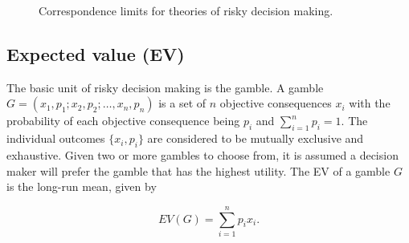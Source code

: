 \documentclass{article}\usepackage[]{graphicx}\usepackage[]{color}
\begin{document}
\begin{landscape} 
\begin{figure}[H]
\centering    
\noindent{}
\caption{Correspondence limits for theories of risky decision making.\label{fig:correspondence_limits}}
\end{figure}
\label{correspondence_limits_figure}
\end{landscape}

\subsection{Expected value (EV)}

The basic unit of risky decision making is the gamble.
A gamble $G=(x_1, p_1; x_2, p_2; \ldots, x_n, p_n)$ is a set of $n$ objective consequences $x_i$ with the
probability of each objective consequence being $p_i$ and $\sum\limits_{i=1}^{n} p_i = 1$. The individual outcomes $\{x_i, p_i\}$ are considered to be mutually exclusive and exhaustive. Given two or more gambles to choose from, it is assumed a decision maker will prefer the gamble that has the highest
utility.
The EV of a gamble $G$ is the long-run mean, given by

\begin{equation}
EV(G) = \sum_{i=1}^{n} p_i x_i.
\label{ev_equation}
\end{equation}
\end{document}
